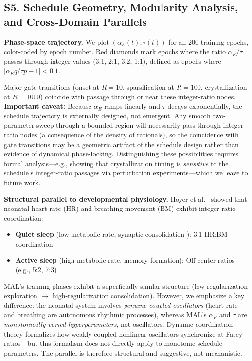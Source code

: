 \documentclass[9pt,twocolumn,twoside]{pnas-new}
\begin{document}
\subsection*{S5. Schedule Geometry, Modularity Analysis, and Cross-Domain Parallels}
\textbf{Phase-space trajectory.} We plot $(\alpha_E(t), \tau(t))$ for all 200 training epochs, color-coded by epoch number. Red diamonds mark epochs where the ratio $\alpha_E / \tau$ passes through integer values (3:1, 2:1, 3:2, 1:1), defined as epochs where $|\alpha_E q / \tau p - 1| < 0.1$.

Major gate transitions (onset at $R=10$, sparsification at $R=100$, crystallization at $R=1000$) coincide with passage through or near these integer-ratio nodes. \textbf{Important caveat:} Because $\alpha_E$ ramps linearly and $\tau$ decays exponentially, the schedule trajectory is externally designed, not emergent. Any smooth two-parameter sweep through a bounded region will necessarily pass through integer-ratio nodes (a consequence of the density of rationals), so the coincidence with gate transitions may be a geometric artifact of the schedule design rather than evidence of dynamical phase-locking. Distinguishing these possibilities requires formal analysis---e.g., showing that crystallization timing is \textit{sensitive} to the schedule's integer-ratio passages via perturbation experiments---which we leave to future work.

\textbf{Structural parallel to developmental physiology.} Hoyer et al.\ \cite{Hoyer2001} showed that neonatal heart rate (HR) and breathing movement (BM) exhibit integer-ratio coordination:
\begin{itemize}
\item \textbf{Quiet sleep} (low metabolic rate, synaptic consolidation \cite{Tononi2020}): 3:1 HR:BM coordination
\item \textbf{Active sleep} (high metabolic rate, memory formation): Off-center ratios (e.g., 5:2, 7:3)
\end{itemize}

MAL's training phases exhibit a superficially similar structure (low-regularization exploration $\to$ high-regularization consolidation). However, we emphasize a key difference: the neonatal system involves \textit{genuine coupled oscillators} (heart rate and breathing are autonomous rhythmic processes), whereas MAL's $\alpha_E$ and $\tau$ are \textit{monotonically varied hyperparameters}, not oscillators. Dynamic coordination theory \cite{Schoner1988} formalizes how weakly coupled nonlinear oscillators synchronize at Farey ratios---but this formalism does not directly apply to monotonic schedule parameters. The parallel is therefore structural and suggestive, not mechanistic.
\end{document}
